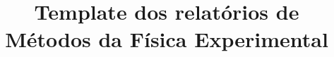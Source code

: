 \documentclass{article}
\begin{document}
	\title{Template dos relatórios de Métodos da Física Experimental}
	
	
	
	\begin{titlepage}
		\begin{center}
			\begin{figure}[!ht]
				\centering
				

\end{figure}
\end{center}
\end{titlepage}
\end{document}
